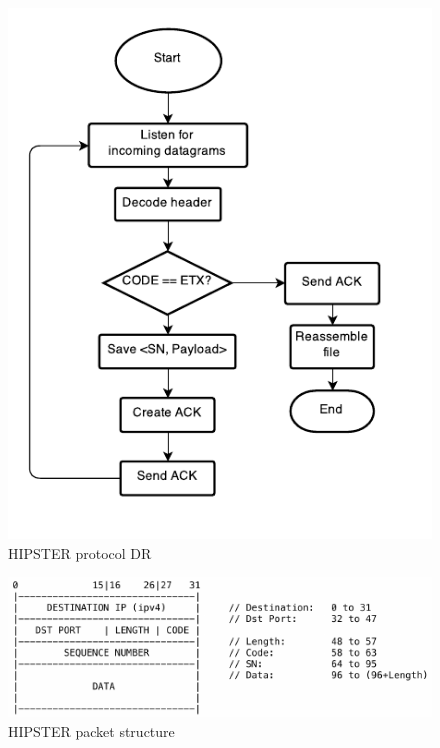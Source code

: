 \documentclass[10pt,twocolumn]{article}
\begin{document}
\begin{figure}[h]
  \centering
  \includegraphics[width=0.75\columnwidth, keepaspectratio]{Documentation/Receiver.pdf}
  \caption{HIPSTER protocol DR}
  \label{fig:receiverFlowchart}
\end{figure}

\begin{figure}[h]
	\centering
    \includegraphics[width=0.95\columnwidth]{tex/images/packet_structure.pdf}
	\caption{HIPSTER packet structure}
	\label{fig:header}
\end{figure}
\end{document}
